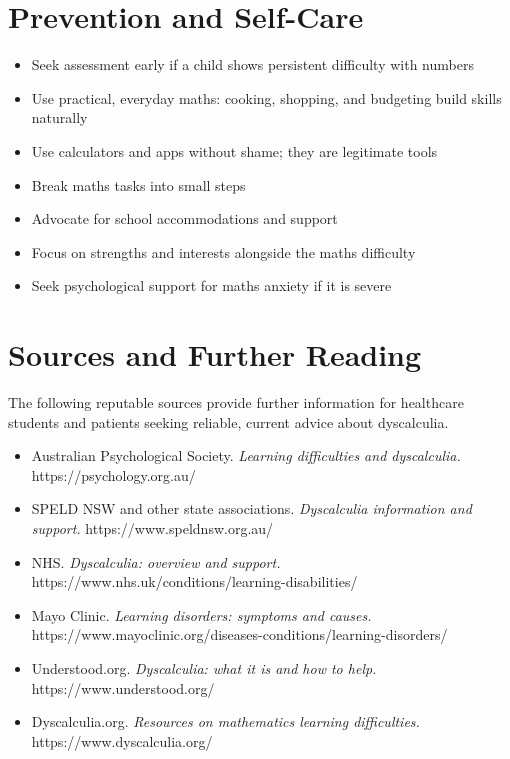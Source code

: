 \section*{Prevention and Self-Care}
\begin{itemize}
    \item Seek assessment early if a child shows persistent difficulty with numbers
    \item Use practical, everyday maths: cooking, shopping, and budgeting build skills naturally
    \item Use calculators and apps without shame; they are legitimate tools
    \item Break maths tasks into small steps
    \item Advocate for school accommodations and support
    \item Focus on strengths and interests alongside the maths difficulty
    \item Seek psychological support for maths anxiety if it is severe
\end{itemize}

\section*{Sources and Further Reading}
The following reputable sources provide further information for healthcare students and patients seeking reliable, current advice about dyscalculia.
\begin{itemize}
    \item Australian Psychological Society. \textit{Learning difficulties and dyscalculia.} https://psychology.org.au/
    \item SPELD NSW and other state associations. \textit{Dyscalculia information and support.} https://www.speldnsw.org.au/
    \item NHS. \textit{Dyscalculia: overview and support.} https://www.nhs.uk/conditions/learning-disabilities/
    \item Mayo Clinic. \textit{Learning disorders: symptoms and causes.} https://www.mayoclinic.org/diseases-conditions/learning-disorders/
    \item Understood.org. \textit{Dyscalculia: what it is and how to help.} https://www.understood.org/
    \item Dyscalculia.org. \textit{Resources on mathematics learning difficulties.} https://www.dyscalculia.org/
\end{itemize}
